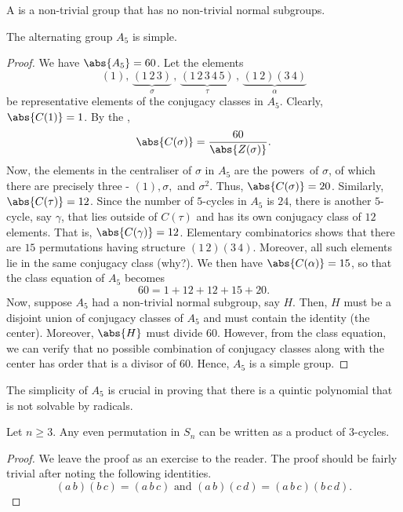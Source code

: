\begin{defn}
    A  is a non-trivial group that has no non-trivial normal subgroups.
\end{defn}
\begin{prop}
    The alternating group $A_5$ is simple.
\end{prop}
\begin{proof}
    We have $\abs{A_5} = 60$. Let the elements
    \[
        (1), \, \underbrace{(1 \, 2 \, 3)}_{\sigma}\, , \, \underbrace{(1 \, 2 \, 3 \, 4 \, 5)}_{\tau} \, , \, \underbrace{(1\, 2)(3\, 4)}_{\alpha}
    \]
    be representative elements of the conjugacy classes in $A_5$. Clearly, $\abs{C(1)} = 1$. By the , 
    \[
        \abs{C(\sigma)} = \frac{60}{\abs{Z(\sigma)}}.
    \]
    Now, the elements in the centraliser of $\sigma$ in $A_5$ are the powers\footnotemark\ of $\sigma$, of which there are precisely three - $(1), \sigma,$ and $\sigma^2$. Thus, $\abs{C(\sigma)} = 20$. Similarly, $\abs{C(\tau)} = 12$. Since the number of $5$-cycles in $A_5$ is $24$, there is another $5$-cycle, say $\gamma$, that lies outside of $C(\tau)$ and has its own conjugacy class of $12$ elements. That is, $\abs{C(\gamma)} = 12$. Elementary combinatorics shows that there are $15$ permutations having structure $(1 \, 2)(3 \, 4)$. Moreover, all such elements lie in the same conjugacy class (why?). We then have $\abs{C(\alpha)} = 15$, so that the class equation of $A_5$ becomes
    \[
        60 = 1 + 12 + 12 + 15 + 20.
    \]
    Now, suppose $A_5$ had a non-trivial normal subgroup, say $H$. Then, $H$ must be a disjoint union of conjugacy classes of $A_5$ and must contain the identity (the center). Moreover, $\abs{H}$ must divide $60$. However, from the class equation, we can verify that no possible combination of conjugacy classes along with the center has order that is a divisor of $60$. Hence, $A_5$ is a simple group. 
\end{proof}

\begin{rem}
    The simplicity of $A_5$ is crucial in proving that there is a quintic polynomial that is not solvable by radicals.
\end{rem}

\begin{lem} \label{lem:every-even-permutation-as-prod-of-3-cycles}
    Let $n \geq 3$. Any even permutation in $S_n$ can be written as a product of $3$-cycles. 
\end{lem}
\begin{proof}
    We leave the proof as an exercise to the reader. The proof should be fairly trivial after noting the following identities.
    \[
        (a \, b)(b \, c) = (a \, b \, c) \text{ and } (a \, b)(c \, d) = (a \, b \, c)(b \, c \, d).
    \]
\end{proof}

